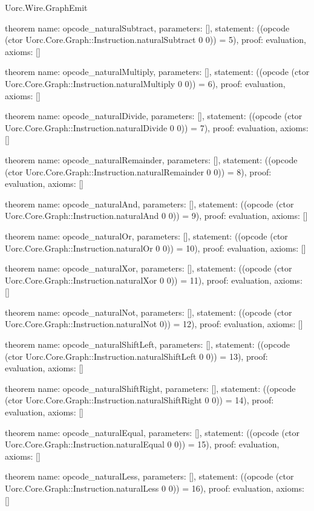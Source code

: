 \begin{lexlean}{Uorc.Wire.GraphEmit}
\begin{semanticmodule}
theorem{
  name: opcode_naturalSubtract,
  parameters: [],
  statement: ((opcode (ctor Uorc.Core.Graph::Instruction.naturalSubtract 0 0)) = 5),
  proof: evaluation{},
  axioms: []
}

theorem{
  name: opcode_naturalMultiply,
  parameters: [],
  statement: ((opcode (ctor Uorc.Core.Graph::Instruction.naturalMultiply 0 0)) = 6),
  proof: evaluation{},
  axioms: []
}

theorem{
  name: opcode_naturalDivide,
  parameters: [],
  statement: ((opcode (ctor Uorc.Core.Graph::Instruction.naturalDivide 0 0)) = 7),
  proof: evaluation{},
  axioms: []
}

theorem{
  name: opcode_naturalRemainder,
  parameters: [],
  statement: ((opcode (ctor Uorc.Core.Graph::Instruction.naturalRemainder 0 0)) = 8),
  proof: evaluation{},
  axioms: []
}

theorem{
  name: opcode_naturalAnd,
  parameters: [],
  statement: ((opcode (ctor Uorc.Core.Graph::Instruction.naturalAnd 0 0)) = 9),
  proof: evaluation{},
  axioms: []
}

theorem{
  name: opcode_naturalOr,
  parameters: [],
  statement: ((opcode (ctor Uorc.Core.Graph::Instruction.naturalOr 0 0)) = 10),
  proof: evaluation{},
  axioms: []
}

theorem{
  name: opcode_naturalXor,
  parameters: [],
  statement: ((opcode (ctor Uorc.Core.Graph::Instruction.naturalXor 0 0)) = 11),
  proof: evaluation{},
  axioms: []
}

theorem{
  name: opcode_naturalNot,
  parameters: [],
  statement: ((opcode (ctor Uorc.Core.Graph::Instruction.naturalNot 0)) = 12),
  proof: evaluation{},
  axioms: []
}

theorem{
  name: opcode_naturalShiftLeft,
  parameters: [],
  statement: ((opcode (ctor Uorc.Core.Graph::Instruction.naturalShiftLeft 0 0)) = 13),
  proof: evaluation{},
  axioms: []
}

theorem{
  name: opcode_naturalShiftRight,
  parameters: [],
  statement: ((opcode (ctor Uorc.Core.Graph::Instruction.naturalShiftRight 0 0)) = 14),
  proof: evaluation{},
  axioms: []
}

theorem{
  name: opcode_naturalEqual,
  parameters: [],
  statement: ((opcode (ctor Uorc.Core.Graph::Instruction.naturalEqual 0 0)) = 15),
  proof: evaluation{},
  axioms: []
}

theorem{
  name: opcode_naturalLess,
  parameters: [],
  statement: ((opcode (ctor Uorc.Core.Graph::Instruction.naturalLess 0 0)) = 16),
  proof: evaluation{},
  axioms: []
}


\end{semanticmodule}
\end{lexlean}

